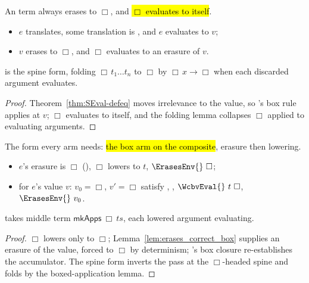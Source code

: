 \begin{lemma}
\label{lem:erases_correct_box}
\leanok
{}
 An \Erasable{} term always erases to $\Box$, and \hl{$\Box$ evaluates to itself}.
\begin{itemize}
\item {} $e$ translates, some translation is \Erasable{}, and $e$ evaluates to $v$;
\item {} $v$ erases to $\Box$, and $\Box$ evaluates to an erasure of $v$.
\end{itemize}
  is the spine form, folding $\Box\,t_1\dots t_n$ to $\Box$
by $\Box\,x \to \Box$ when each discarded argument evaluates.
\end{lemma}
\begin{proof}
\leanok
{}
 Theorem~\ref{thm:SEval-defeq} moves irrelevance to the value, so \Erases{}'s box rule
applies at $v$; $\Box$ evaluates to itself, and the folding lemma collapses $\Box$ applied to evaluating
arguments.
\end{proof}

\begin{lemma}
\label{lem:erases_correct_boxLow}
\leanok
{}
 The form every arm needs: \hl{the box arm on the composite}, erasure then lowering.
\begin{itemize}
\item {} $e$'s erasure is $\Box$ (), $\Box$ lowers to $t$, $\ErasesEnv{}\ \Box$;
\item {} for $e$'s value $v$: $v_0 = \Box$, $v' = \Box$ satisfy \Erases{}, \Lower{},
$\WcbvEval{}\ t\ \Box$, $\ErasesEnv{}\ v_0$.
\end{itemize}
  takes middle term $\mathsf{mkApps}\ \Box\ ts$, each
lowered argument evaluating.
\end{lemma}
\begin{proof}
\leanok
{}
 $\Box$ lowers only to $\Box$; Lemma~\ref{lem:erases_correct_box} supplies an erasure of the
value, forced to $\Box$ by determinism; \ErasesEnv{}'s box closure re-establishes the accumulator. The
spine form inverts the pass at the $\Box$-headed spine and folds by the boxed-application lemma.
\end{proof}

